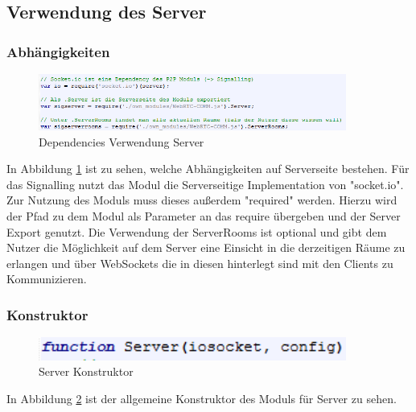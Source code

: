 \subsection{Verwendung des Server}
\subsubsection{Abhängigkeiten}
\begin{figure}[htH]
\centering
\includegraphics[width=0.9\textwidth]{backend/Modul_UserServerDependencies.PNG}
\caption{Dependencies Verwendung Server}
\label{backfig6}
\end{figure}
In Abbildung \ref{backfig6} ist zu sehen, welche Abhängigkeiten auf Serverseite bestehen.
Für das Signalling nutzt das Modul die Serverseitige Implementation von "socket.io". 
Zur Nutzung des Moduls muss dieses außerdem "required" werden. Hierzu wird der Pfad zu dem Modul als Parameter an das require übergeben und der Server Export genutzt.
Die Verwendung der ServerRooms ist optional und gibt dem Nutzer die Möglichkeit auf dem Server eine Einsicht in die derzeitigen Räume zu erlangen und über WebSockets die in diesen hinterlegt sind mit den Clients zu Kommunizieren.



\subsubsection{Konstruktor}
\begin{figure}[htH]
\centering
\includegraphics[width=0.9\textwidth]{backend/Modul_ServerContructor.PNG}
\caption{Server Konstruktor}
\label{backfig7}
\end{figure}
In Abbildung \ref{backfig7} ist der allgemeine Konstruktor des Moduls für Server zu sehen.



